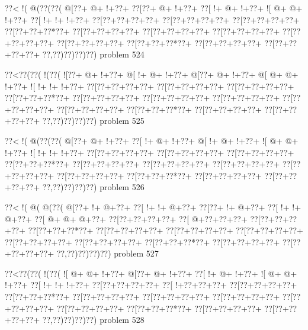 \vbox{\vbox{\goo
\0??<\- !(\- @(\0??(\0??(
\- @[\0??+\- @+\- !+\0??+
\0??[\0??+\- @+\- !+\0??+
\0??[\- !+\- @+\- !+\0??+
\- ![\- @+\- @+\- !+\0??+
\0??[\- !+\- !+\- !+\0??+
\0??[\0??+\0??+\0??+\0??+
\0??[\0??+\0??+\0??+\0??+
\0??[\0??+\0??+\0??+\0??+
\0??[\0??+\0??+\0??*\0??+
\0??[\0??+\0??+\0??+\0??+
\0??[\0??+\0??+\0??+\0??+
\0??[\0??+\0??+\0??+\0??+
\0??[\0??+\0??+\0??+\0??+
\0??[\0??+\0??+\0??+\0??+
\0??[\0??+\0??+\0??*\0??+
\0??[\0??+\0??+\0??+\0??+
\0??[\0??+\0??+\0??+\0??+
\0??,\0??)\0??)\0??)\0??)
}
\hfil problem 524\hfil\break
}

\vbox{\vbox{\goo
\0??<\0??(\0??(\- !(\0??(
\- ![\0??+\- @+\- !+\0??+
\- @[\- !+\- @+\- !+\0??+
\- @[\0??+\- @+\- !+\0??+
\- @[\- @+\- @+\- !+\0??+
\- ![\- !+\- !+\- !+\0??+
\0??[\0??+\0??+\0??+\0??+
\0??[\0??+\0??+\0??+\0??+
\0??[\0??+\0??+\0??+\0??+
\0??[\0??+\0??+\0??*\0??+
\0??[\0??+\0??+\0??+\0??+
\0??[\0??+\0??+\0??+\0??+
\0??[\0??+\0??+\0??+\0??+
\0??[\0??+\0??+\0??+\0??+
\0??[\0??+\0??+\0??+\0??+
\0??[\0??+\0??+\0??*\0??+
\0??[\0??+\0??+\0??+\0??+
\0??[\0??+\0??+\0??+\0??+
\0??,\0??)\0??)\0??)\0??)
}
\hfil problem 525\hfil\break
}

\vbox{\vbox{\goo
\0??<\- !(\- @(\0??(\0??(
\- @[\0??+\- @+\- !+\0??+
\0??[\- !+\- @+\- !+\0??+
\- @[\- !+\- @+\- !+\0??+
\- ![\- @+\- @+\- !+\0??+
\- ![\- !+\- !+\- !+\0??+
\0??[\0??+\0??+\0??+\0??+
\0??[\0??+\0??+\0??+\0??+
\0??[\0??+\0??+\0??+\0??+
\0??[\0??+\0??+\0??*\0??+
\0??[\0??+\0??+\0??+\0??+
\0??[\0??+\0??+\0??+\0??+
\0??[\0??+\0??+\0??+\0??+
\0??[\0??+\0??+\0??+\0??+
\0??[\0??+\0??+\0??+\0??+
\0??[\0??+\0??+\0??*\0??+
\0??[\0??+\0??+\0??+\0??+
\0??[\0??+\0??+\0??+\0??+
\0??,\0??)\0??)\0??)\0??)
}
\hfil problem 526\hfil\break
}

\vbox{\vbox{\goo
\0??<\- !(\- @(\- @(\0??(
\- @[\0??+\- !+\- @+\0??+
\0??[\- !+\- !+\- @+\0??+
\0??[\0??+\- !+\- @+\0??+
\0??[\- !+\- !+\- @+\0??+
\0??[\- @+\- @+\- @+\0??+
\0??[\0??+\0??+\0??+\0??+
\0??[\- @+\0??+\0??+\0??+
\0??[\0??+\0??+\0??+\0??+
\0??[\0??+\0??+\0??*\0??+
\0??[\0??+\0??+\0??+\0??+
\0??[\0??+\0??+\0??+\0??+
\0??[\0??+\0??+\0??+\0??+
\0??[\0??+\0??+\0??+\0??+
\0??[\0??+\0??+\0??+\0??+
\0??[\0??+\0??+\0??*\0??+
\0??[\0??+\0??+\0??+\0??+
\0??[\0??+\0??+\0??+\0??+
\0??,\0??)\0??)\0??)\0??)
}
\hfil problem 527\hfil\break
}

\vbox{\vbox{\goo
\0??<\0??(\0??(\- !(\0??(
\- ![\- @+\- @+\- !+\0??+
\- @[\0??+\- @+\- !+\0??+
\0??[\- !+\- @+\- !+\0??+
\- ![\- @+\- @+\- !+\0??+
\0??[\- !+\- !+\- !+\0??+
\0??[\0??+\0??+\0??+\0??+
\0??[\- !+\0??+\0??+\0??+
\0??[\0??+\0??+\0??+\0??+
\0??[\0??+\0??+\0??*\0??+
\0??[\0??+\0??+\0??+\0??+
\0??[\0??+\0??+\0??+\0??+
\0??[\0??+\0??+\0??+\0??+
\0??[\0??+\0??+\0??+\0??+
\0??[\0??+\0??+\0??+\0??+
\0??[\0??+\0??+\0??*\0??+
\0??[\0??+\0??+\0??+\0??+
\0??[\0??+\0??+\0??+\0??+
\0??,\0??)\0??)\0??)\0??)
}
\hfil problem 528\hfil\break
}

